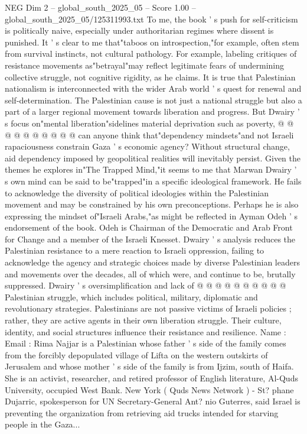 \begin{textsample}{NEG Dim 2 – global\_south\_2025\_05 – Score 1.00 – global\_south\_2025\_05/125311993.txt}
To me, the book ' s push for self-criticism is politically naive, especially under authoritarian regimes where dissent is punished.
It ' s clear to me that"taboos on introspection,"for example, often stem from survival instincts, not cultural pathology.
For example, labeling critiques of resistance movements as"betrayal"may reflect legitimate fears of undermining collective struggle, not cognitive rigidity, as he claims.
It is true that Palestinian nationalism is interconnected with the wider Arab world ' s quest for renewal and self-determination.
The Palestinian cause is not just a national struggle but also a part of a larger regional movement towards liberation and progress.
But Dwairy ' s focus on"mental liberation"sidelines material deprivation such as poverty, @ @ @ @ @ @ @ @ @ @ can anyone think that"dependency mindsets"and not Israeli rapaciousness constrain Gaza ' s economic agency?
Without structural change, aid dependency imposed by geopolitical realities will inevitably persist.
Given the themes he explores in"The Trapped Mind,"it seems to me that Marwan Dwairy ' s own mind can be said to be"trapped"in a specific ideological framework.
He fails to acknowledge the diversity of political ideologies within the Palestinian movement and may be constrained by his own preconceptions.
Perhaps he is also expressing the mindset of"Israeli Arabs,"as might be reflected in Ayman Odeh ' s endorsement of the book.
Odeh is Chairman of the Democratic and Arab Front for Change and a member of the Israeli Knesset.
Dwairy ' s analysis reduces the Palestinian resistance to a mere reaction to Israeli oppression, failing to acknowledge the agency and strategic choices made by diverse Palestinian leaders and movements over the decades, all of which were, and continue to be, brutally suppressed.
Dwairy ' s oversimplification and lack of @ @ @ @ @ @ @ @ @ @ Palestinian struggle, which includes political, military, diplomatic and revolutionary strategies.
Palestinians are not passive victims of Israeli policies ; rather, they are active agents in their own liberation struggle.
Their culture, identity, and social structures influence their resistance and resilience.
Name : Email : Rima Najjar is a Palestinian whose father ' s side of the family comes from the forcibly depopulated village of Lifta on the western outskirts of Jerusalem and whose mother ' s side of the family is from Ijzim, south of Haifa.
She is an activist, researcher, and retired professor of English literature, Al-Quds University, occupied West Bank.
New York ( Quds News Network ) - St? phane Dujarric, spokesperson for UN Secretary-General Ant? nio Guterres, said Israel is preventing the organization from retrieving aid trucks intended for starving people in the Gaza...

\end{textsample}
